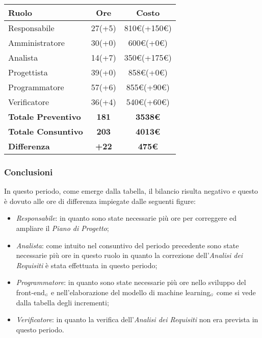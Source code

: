 {{{{{{{{{	\quad
	\def\tabularxcolumn#1{m{#1}}
	{
		\begin{center}
			\renewcommand{\arraystretch}{1.4}
			\begin{tabularx}{10cm}{|X|c|c|}
				\hline
				\rowcolor{airforceblue}
				\textbf{Ruolo} & \textbf{Ore} & \textbf{Costo}\\
				\hline
				Responsabile & 27(+5) & 810\euro(+150\euro)\\
				\hline
				Amministratore & 30(+0) & 600\euro(+0\euro)\\
				\hline
				Analista & 14(+7) & 350\euro(+175\euro)\\
				\hline
				Progettista & 39(+0) & 858\euro(+0\euro)\\
				\hline
				Programmatore & 57(+6) & 855\euro(+90\euro)\\
				\hline
				Verificatore & 36(+4) & 540\euro(+60\euro)\\
				\hline
				\textbf{Totale Preventivo} & \textbf{181} & \textbf{3538\euro}\\
				\hline
				\textbf{Totale Consuntivo} & \textbf{203} & \textbf{4013\euro}\\
				\hline
				\textbf{Differenza} & \textbf{+22} & \textbf{475\euro}
			\end{tabularx}
		\end{center}
		
	\subsubsection{Conclusioni}\label{ConsuntivoSecondoPeriodoDiProgettazioneDiDettaglioCodificaConclusioni}
		In questo periodo, come emerge dalla tabella, il bilancio risulta negativo e questo è dovuto alle ore di differenza impiegate dalle seguenti figure: 
		\begin{itemize}
			\item \textit{Responsabile}: in quanto sono state necessarie più ore per correggere ed ampliare il \textit{Piano di Progetto};
			\item \textit{Analista}: come intuito nel consuntivo del periodo precedente sono state necessarie più ore in questo ruolo in quanto la correzione dell'\textit{Analisi dei Requisiti} è stata effettuata in questo periodo;
			\item \textit{Programmatore}: in quanto sono state necessarie più ore nello sviluppo del front-end$_{\scaleto{G}{3pt}}$ e nell'elaborazione del modello di machine learning$_{\scaleto{G}{3pt}}$ come si vede dalla tabella degli incrementi;
			\item \textit{Verificatore}: in quanto la verifica dell'\textit{Analisi dei Requisiti} non era prevista in questo periodo.
		\end{itemize}
		
}}}}}}}}}}
